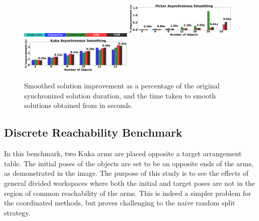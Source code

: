 {%
\begin{figure}[h]
	\centering	
	\includegraphics[width=0.48\textwidth]{figures/results/labels}
	\includegraphics[width=0.48\textwidth]{figures/results/sp_smoothing}
	\includegraphics[width=0.48\textwidth]{figures/results/kuka_smoothing}
	\caption{Smoothed solution improvement as a percentage of the original synchronized solution duration, and the time taken to smooth solutions obtained from \algo in seconds.}
	\label{fig:smoothing}
\end{figure}

\subsection{Discrete Reachability Benchmark}
In this benchmark, two Kuka arms are placed opposite a target arrangement table. The initial poses of the objects are set to be on opposite ends of the arms, as demonstrated in the image. The purpose of this study is to see the effects of general divided workspaces where both the initial and target poses are not in the region of common reachability of the arms. This is indeed a simpler problem for the coordinated methods, but proves challenging to the naive random split strategy. 

}
